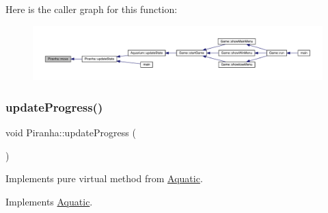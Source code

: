 Here is the caller graph for this function\+:
\nopagebreak
\begin{figure}[H]
\begin{center}
\leavevmode
\includegraphics[width=350pt]{class_piranha_a6b86e73b3e5a57ee0fdb768c24ab9b67_icgraph}
\end{center}
\end{figure}
\mbox{\label{class_piranha_ac4906080867655ef09591eba1cf2f00c}} 
\subsubsection{\texorpdfstring{update\+Progress()}{updateProgress()}}
{\footnotesize\ttfamily void Piranha\+::update\+Progress (\begin{DoxyParamCaption}{ }\end{DoxyParamCaption})\hspace{0.3cm}{\ttfamily [virtual]}}



Implements pure virtual method from \mbox{\hyperlink{class_aquatic}{Aquatic}}. 



Implements \mbox{\hyperlink{class_aquatic_ae1b6301ed27d6aadb73c7ee7879c24af}{Aquatic}}.

